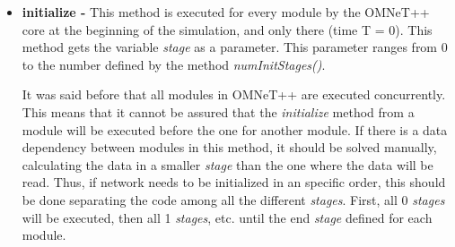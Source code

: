 \begin{itemize}
 \item \textbf{initialize - }This method is executed for every module by the \ac{OMNeT++} core  at the beginning of the simulation, and only there 
(time T = 0). This method gets the variable \textit{stage} as a parameter. This parameter ranges from 0 to the number defined by the method 
\textit{numInitStages()}.

It was said before that all modules in \ac{OMNeT++} are executed concurrently. This means that it cannot be assured that the \textit{initialize} method from 
a module will be executed before the one for another module. If there is a data dependency between modules in this method, it should be solved
manually, calculating the data in a smaller \textit{stage} than the one where the data will be read. Thus, if network needs to be initialized in an 
specific order, this should be done separating the code among all the different \textit{stages}. First, all 0 \textit{stages} will be executed, then all 
1 \textit{stages}, etc. until the end \textit{stage} defined for each module.


\end{itemize}
